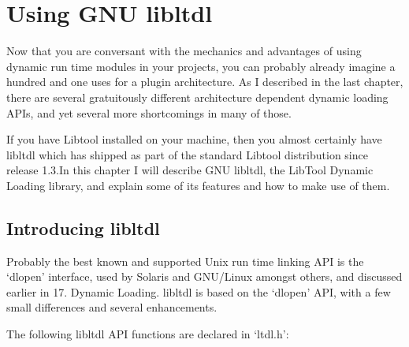 \chapter{Using GNU libltdl}\label{C_Using_GNU_libltdl}

Now that you are conversant with the mechanics and advantages of using dynamic run time modules in your projects, you can probably already imagine a hundred and one uses for a plugin architecture. As I described in the last chapter, there are several gratuitously different architecture dependent dynamic loading APIs, and yet several more shortcomings in many of those.

If you have Libtool installed on your machine, then you almost certainly have libltdl which has shipped as part of the standard Libtool distribution since release 1.3.In this chapter I will describe GNU libltdl, the LibTool Dynamic Loading library, and explain some of its features and how to make use of them. 

\section{Introducing libltdl}

Probably the best known and supported Unix run time linking API is the `dlopen' interface, used by Solaris and GNU/Linux amongst others, and discussed earlier in 17. Dynamic Loading. libltdl is based on the `dlopen' API, with a few small differences and several enhancements.

The following libltdl API functions are declared in `ltdl.h': 

